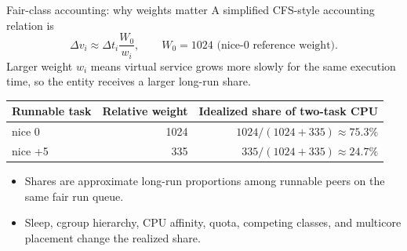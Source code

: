 \documentclass[aspectratio=169,11pt]{beamer}
\begin{document}
\begin{frame}{Fair-class accounting: why weights matter}
  \small
  A simplified CFS-style accounting relation is
  \[
    \Delta v_i \approx \Delta t_i\frac{W_0}{w_i},
    \qquad W_0=1024\text{ (nice-0 reference weight)}.
  \]
  Larger weight $w_i$ means virtual service grows more slowly for the same execution time, so the entity receives a larger long-run share.
  \begin{center}
    \begin{tabular}{lrr}
      \toprule
      Runnable task & Relative weight & Idealized share of two-task CPU \\
      \midrule
      nice 0 & 1024 & $1024/(1024+335)\approx75.3\%$ \\
      nice +5 & 335 & $335/(1024+335)\approx24.7\%$ \\
      \bottomrule
    \end{tabular}
  \end{center}
  \begin{itemize}
    \item Shares are approximate long-run proportions among runnable peers on the same fair run queue.
    \item Sleep, cgroup hierarchy, CPU affinity, quota, competing classes, and multicore placement change the realized share.
  \end{itemize}
\end{frame}
\end{document}
